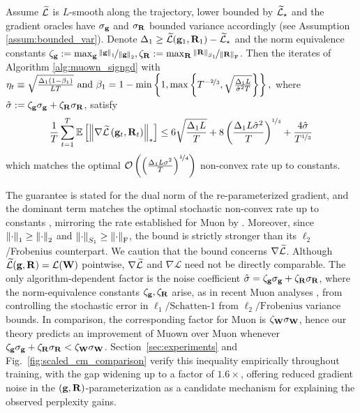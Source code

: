 \documentclass{article}
\newcommand{\algname}{Muown}
\begin{document}
\begin{theorem}[Stochastic Convergence of \algname{}]\label{thm:stoch_convergence}
    Assume $\widetilde {\mathcal{L}}$ is $L$-smooth along the trajectory, lower bounded by $\widetilde {\mathcal{L}}_\star$ and the gradient oracles have $\sigma_{\mathbf{g}}$ and $\sigma_{\mathbf{R}}$ bounded variance accordingly (see Assumption \ref{assum:bounded_var}). Denote $\Delta_1 \geq \widetilde {\mathcal{L}}(\mathbf{g}_1, \mathbf{R}_1) - \widetilde {\mathcal{L}}_\star$ and the norm equivalence constants $\zeta_{\mathbf{g}} := \max_{\mathbf{g}} \nicefrac{\left \| \mathbf{g} \right\|_1}{\left \| \mathbf{g} \right\|_2}, \zeta_{\mathbf{R}} := \max_{\mathbf{R}} \nicefrac{\left \| \mathbf{R} \right\|_{S_1}}{\left \| \mathbf{R} \right\|_{\mathrm{F}}}$. Then the iterates of Algorithm \ref{alg:muown_signgd} with 
    $
        \eta_t \equiv \sqrt{\frac{\Delta_1 (1-\beta_1)}{L T}} \text{ and }
        \beta_1 = 1 - \min\left\{1, \max\left\{T^{-\nicefrac 2 3}, \sqrt{\frac{\Delta_1 L}{\hat\sigma^2 T}}\right\}\right\},
    $
    where $\hat \sigma := \zeta_{\mathbf{g}} \sigma_{\mathbf{g}} + \zeta_{\mathbf{R}} \sigma_{\mathbf{R}}$, satisfy
    \begin{equation*}
    \frac{1}{T}\sum_{t=1}^T \mathbb{E}\left[\left \| \nabla \widetilde {\mathcal{L}}\left( \mathbf{g}_t,\mathbf{R}_t \right) \right\|_*\right]
    \leq 
    6 \sqrt{\frac{\Delta_1 L}{T}}
    + 8 \left( \frac{\Delta_1 L \hat \sigma^2}{T} \right)^{\nicefrac 1 4}
    + \frac{4 \hat \sigma}{T^{\nicefrac 1 3}}
\end{equation*}
    which matches the optimal $\mathcal O\left( \left( \frac{\Delta_1 L \sigma^2}{T} \right)^{\nicefrac 1 4} \right)$ non-convex rate up to constants.
\end{theorem}

The guarantee is stated for the dual norm of the re-parameterized gradient, and the dominant term matches the optimal stochastic non-convex rate up to constants \citep{LowerBoundsNonConvex2023arjevani}, mirroring the rate established for Muon by \cite[Corollary~4.4]{ConvergenceAnalysisMuon2025shen}. Moreover, since $\left \| \cdot \right\|_1 \geq \left \| \cdot \right\|_2$ and $\left \| \cdot \right\|_{S_1} \geq \left \| \cdot \right\|_{\mathrm{F}}$, the bound is strictly stronger than its $\ell_2$/Frobenius counterpart. We caution that the bound concerns $\nabla \widetilde {\mathcal{L}}$. Although $\widetilde {\mathcal{L}}(\mathbf{g}, \mathbf{R}) = \mathcal L(\mathbf{W})$ pointwise, $\nabla \widetilde {\mathcal{L}}$ and $\nabla \mathcal L$ need not be directly comparable. The only algorithm-dependent factor is the noise coefficient $\hat\sigma = \zeta_{\mathbf{g}} \sigma_{\mathbf{g}} + \zeta_{\mathbf{R}} \sigma_{\mathbf{R}}$, where the norm-equivalence constants $\zeta_{\mathbf{g}}, \zeta_{\mathbf{R}}$ arise, as in recent Muon analyses \citep[Theorem~4.3]{ConvergenceAnalysisMuon2025shen}, from controlling the stochastic error in $\ell_1/\text{Schatten-}1$ from $\ell_2/\text{Frobenius}$ variance bounds. In comparison, the corresponding factor for Muon is $\zeta_{\mathbf{W}} \sigma_{\mathbf{W}}$, hence our theory predicts an improvement of \algname{} over Muon whenever $\zeta_{\mathbf{g}} \sigma_{\mathbf{g}} + \zeta_{\mathbf{R}} \sigma_{\mathbf{R}} < \zeta_{\mathbf{W}} \sigma_{\mathbf{W}}$. Section~\ref{sec:experiments} and Fig.~\ref{fig:scaled_cm_comparison} verify this inequality empirically throughout training, with the gap widening up to a factor of $1.6\times$, offering reduced gradient noise in the $(\mathbf{g},\mathbf{R})$-parameterization as a candidate mechanism for explaining the observed perplexity gains.
\end{document}
